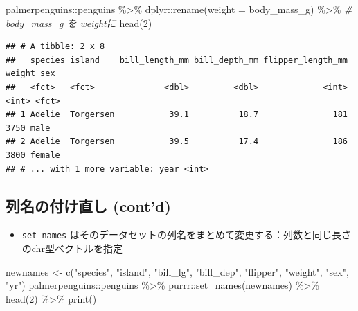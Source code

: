 \documentclass[
]{ltjsarticle}
\newenvironment{Shaded}{\begin{snugshade}}{\end{snugshade}}
\newcommand{\AttributeTok}[1]{\textcolor[rgb]{0.77,0.63,0.00}{#1}}
\newcommand{\CommentTok}[1]{\textcolor[rgb]{0.56,0.35,0.01}{\textit{#1}}}
\newcommand{\DecValTok}[1]{\textcolor[rgb]{0.00,0.00,0.81}{#1}}
\newcommand{\FunctionTok}[1]{\textcolor[rgb]{0.00,0.00,0.00}{#1}}
\newcommand{\NormalTok}[1]{#1}
\newcommand{\OtherTok}[1]{\textcolor[rgb]{0.56,0.35,0.01}{#1}}
\newcommand{\SpecialCharTok}[1]{\textcolor[rgb]{0.00,0.00,0.00}{#1}}
\newcommand{\StringTok}[1]{\textcolor[rgb]{0.31,0.60,0.02}{#1}}
\providecommand{\tightlist}{%
  \setlength{\itemsep}{0pt}\setlength{\parskip}{0pt}}
\begin{document}
\begin{Shaded}
\begin{Highlighting}[]
\NormalTok{palmerpenguins}\SpecialCharTok{::}\NormalTok{penguins }\SpecialCharTok{\%\textgreater{}\%}
\NormalTok{  dplyr}\SpecialCharTok{::}\FunctionTok{rename}\NormalTok{(}\AttributeTok{weight =}\NormalTok{ body\_mass\_g) }\SpecialCharTok{\%\textgreater{}\%} \CommentTok{\# body\_mass\_g を weightに}
  \FunctionTok{head}\NormalTok{(}\DecValTok{2}\NormalTok{)}
\end{Highlighting}
\end{Shaded}

\begin{verbatim}
## # A tibble: 2 x 8
##   species island    bill_length_mm bill_depth_mm flipper_length_mm weight sex   
##   <fct>   <fct>              <dbl>         <dbl>             <int>  <int> <fct> 
## 1 Adelie  Torgersen           39.1          18.7               181   3750 male  
## 2 Adelie  Torgersen           39.5          17.4               186   3800 female
## # ... with 1 more variable: year <int>
\end{verbatim}

\hypertarget{ux5217ux540dux306eux4ed8ux3051ux76f4ux3057-contd}{%
\subsection{列名の付け直し
(cont'd)}\label{ux5217ux540dux306eux4ed8ux3051ux76f4ux3057-contd}}

\begin{itemize}
\tightlist
\item
  \texttt{set\_names}
  はそのデータセットの列名をまとめて変更する：列数と同じ長さのchr型ベクトルを指定
\end{itemize}

\begin{Shaded}
\begin{Highlighting}[]
\NormalTok{newnames }\OtherTok{\textless{}{-}} \FunctionTok{c}\NormalTok{(}\StringTok{"species"}\NormalTok{, }\StringTok{"island"}\NormalTok{, }\StringTok{"bill\_lg"}\NormalTok{, }\StringTok{"bill\_dep"}\NormalTok{, }\StringTok{"flipper"}\NormalTok{, }\StringTok{"weight"}\NormalTok{, }\StringTok{"sex"}\NormalTok{, }\StringTok{"yr"}\NormalTok{)}
\NormalTok{palmerpenguins}\SpecialCharTok{::}\NormalTok{penguins }\SpecialCharTok{\%\textgreater{}\%}
\NormalTok{  purrr}\SpecialCharTok{::}\FunctionTok{set\_names}\NormalTok{(newnames) }\SpecialCharTok{\%\textgreater{}\%}
  \FunctionTok{head}\NormalTok{(}\DecValTok{2}\NormalTok{) }\SpecialCharTok{\%\textgreater{}\%}
  \FunctionTok{print}\NormalTok{()}
\end{Highlighting}
\end{Shaded}
\end{document}
